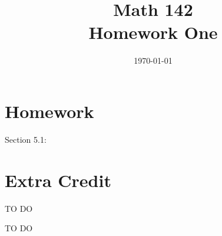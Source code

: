 \documentclass{exam}
\author{}
\date{\today}
\title{Math 142 \\ Homework One}
\begin{document}
  \maketitle

  \section{Homework}

  Section 5.1: 

  \section{Extra Credit}

  TO DO

  \ifprintanswers
    \begin{solution}
      TO DO
    \end{solution}

    \pagebreak
\end{document}
